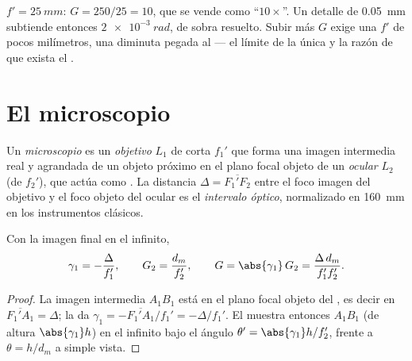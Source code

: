 \begin{example}\label{ex:b1:optical-instruments:loupe}
$f' = \qty{25}{mm}$: $G = 250/25 = 10$, que se vende como ``$10\times$''.
Un detalle de \qty{0.05}{mm} subtiende entonces $\qty{2e-3}{rad}$, de
sobra resuelto. Subir más $G$ exige una $f'$ de pocos milímetros, una
 diminuta pegada al  --- el límite de la  única y la razón de
que exista el .
\end{example}

\section{El microscopio}

\begin{definition}\label{def:b1:optical-instruments:microscope}
Un \emph{microscopio} es un \emph{objetivo} $L_1$ de  corta
$f_1'$ que forma una imagen intermedia real y agrandada de un objeto
próximo en el plano focal objeto de un \emph{ocular} $L_2$ (de  $f_2'$), que actúa como . La distancia $\Delta =
\overline{F_1'F_2}$ entre el foco imagen del objetivo y el foco objeto del
ocular es el \emph{intervalo óptico}, normalizado en \qty{160}{mm} en los
instrumentos clásicos.
\end{definition}

\begin{proposition}\label{prop:b1:optical-instruments:microscope}
Con la imagen final en el infinito,
\[
\gamma_1 = -\frac{\Delta}{f_1'}, \qquad G_2 = \frac{d_m}{f_2'},
\qquad G = \abs{\gamma_1}\,G_2 = \frac{\Delta\,d_m}{f_1' f_2'} .
\]
\end{proposition}

\begin{proof}
La imagen intermedia $A_1B_1$ está en el plano focal objeto del ,
es decir en $\overline{F_1'A_1} = \Delta$; la  da
$\gamma_1 = -\overline{F_1'A_1}/f_1' = -\Delta/f_1'$. El  muestra
entonces $A_1B_1$ (de altura $\abs{\gamma_1} h$) en el infinito bajo el
ángulo $\theta' = \abs{\gamma_1} h/f_2'$, frente a $\theta = h/d_m$ a
simple vista.
\end{proof}

